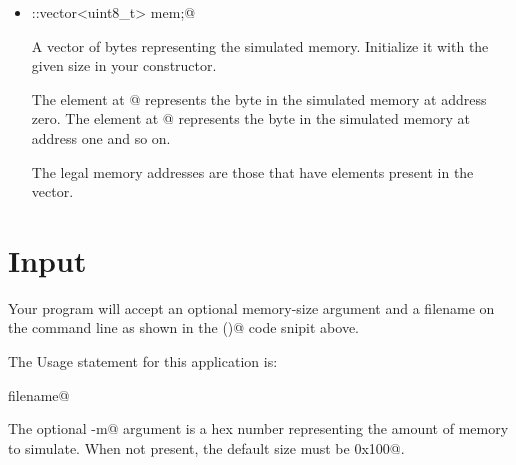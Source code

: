 \documentclass[11pt]{article}
\begin{document}
\begin{itemize}
You must make certain that the file can fit into your memory!  One
simple way to do that is to read the file one byte at-a-time and
check the byte address before you write to it by calling 
\verb@check_illegal()@.  If the address is valid, keep going.  If the
address is not valid, then print the following message to stderr, 
close the file, and return \verb@false@:
\begin{verbatim}
    Program too big.
\end{verbatim}
If the file loads OK then close the file and return \verb@true@.

In order to read the file contents with the extraction operator (\verb@>>@), 
you will want to set \verb@noskipws@ before reading from it like this:\footnote{See 
\url{https://en.cppreference.com/w/cpp/io/manip/skipws} for more information.}
\begin{verbatim}
    uint8_t i;
    infile >> std::noskipws;
    for (uint32_t addr = 0; infile >> i; ++addr)
    {
        ...
    }
\end{verbatim}


\item \verb@std::vector<uint8_t> mem;@

A vector of bytes representing the simulated memory.  Initialize it
with the given size in your constructor.

The element at \verb@mem[0]@ represents the byte in the simulated memory at address
zero.  The element at \verb@mem[1]@ represents the byte in the simulated memory at 
address one and so on.

The legal memory addresses are those that have elements present in the \verb@mem@ vector.

\end{itemize}

\section{Input}

Your program will accept an optional memory-size argument and a filename on
the command line as shown in the \verb@main()@ code snipit above.

The Usage statement for this application is:

 filename@    

The optional \verb@-m@ argument is a hex number representing the amount of 
memory to simulate.  When not present, the default size must be \verb@0x100@.
\end{document}
